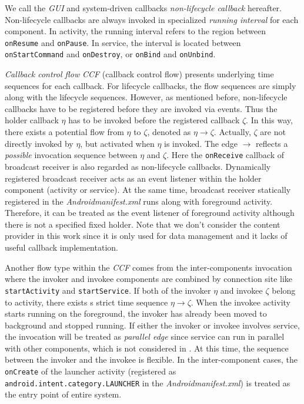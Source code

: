 We call the \textit{GUI} and system-driven callbacks \textit{non-lifecycle callback} hereafter. Non-lifecycle callbacks are always invoked in specialized \textit{running interval} for each component. In activity, the running interval refers to the region between \texttt{onResume} and \texttt{onPause}. In service, the interval is located between \texttt{onStartCommand} and \texttt{onDestroy}, or \texttt{onBind} and \texttt{onUnbind}.

\textit{Callback control flow} \textit{CCF} (callback control flow)\cite{new2015static} presents underlying time sequences for each callback. For lifecycle callbacks, the flow sequences are simply along with the lifecycle sequences. However, as mentioned before, non-lifecycle callbacks have to be registered before they are invoked via events. Thus the holder callback $ \eta $ has to be invoked before the registered callback $ \zeta $. In this way, there exists a potential flow from $ \eta $ to $ \zeta $, denoted as $ \eta \rightarrow \zeta $. Actually, $ \zeta $ are not directly invoked by $ \eta $, but activated when $ \eta $ is invoked. The edge $ \rightarrow $ reflects a \textit{possible} invocation sequence between $ \eta $ and $ \zeta $. Here the \texttt{onReceive} callback of broadcast receiver is also regarded as non-lifecycle callbacks. Dynamically registered broadcast receiver acts as an event listener within the holder component (activity or service). At the same time, broadcast receiver statically registered in the \textit{Androidmanifest.xml} runs along with foreground activity. Therefore, it can be treated as the event listener of foreground activity although there is not a specified fixed holder. Note that we don't consider the content provider in this work since it is only used for data management and it lacks of useful callback implementation. 

Another flow type within the \textit{CCF} comes from the inter-components invocation where the invoker and invokee components are combined by connection site like \texttt{startActivity} and \texttt{startService}. If both of the invoker $ \eta $ and invokee $ \zeta $ belong to activity, there exists s strict time sequence $ \eta \rightarrow \zeta $. When the invokee activity starts running on the foreground, the invoker has already been moved to background and stopped running. If either the invoker or invokee involves service, the invocation will be treated as \textit{parallel edge} since service can run in parallel with other components, which is not considered in \cite{new2015static}. At this time, the sequence between the invoker and the invokee is flexible. In the inter-component cases, the \texttt{onCreate} of the launcher activity (registered as \texttt{android.intent.category.LAUNCHER} in the \textit{Androidmanifest.xml}) is treated as the entry point of entire system.